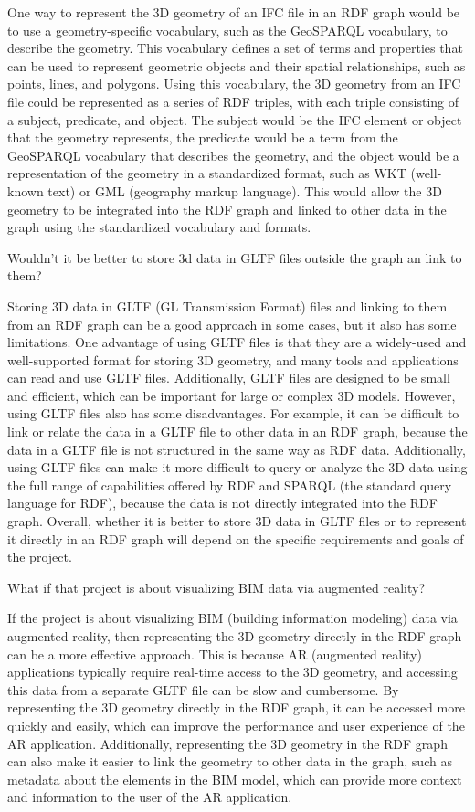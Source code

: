 \begin{description}
	\gpt One way to represent the 3D geometry of an IFC file in an RDF graph would be to use a geometry-specific vocabulary, such as the GeoSPARQL vocabulary, to describe the geometry. This vocabulary defines a set of terms and properties that can be used to represent geometric objects and their spatial relationships, such as points, lines, and polygons. Using this vocabulary, the 3D geometry from an IFC file could be represented as a series of RDF triples, with each triple consisting of a subject, predicate, and object. The subject would be the IFC element or object that the geometry represents, the predicate would be a term from the GeoSPARQL vocabulary that describes the geometry, and the object would be a representation of the geometry in a standardized format, such as WKT (well-known text) or GML (geography markup language). This would allow the 3D geometry to be integrated into the RDF graph and linked to other data in the graph using the standardized vocabulary and formats.

	\me Wouldn't it be better to store 3d data in GLTF files outside the graph an link to them?

	\gpt Storing 3D data in GLTF (GL Transmission Format) files and linking to them from an RDF graph can be a good approach in some cases, but it also has some limitations. One advantage of using GLTF files is that they are a widely-used and well-supported format for storing 3D geometry, and many tools and applications can read and use GLTF files. Additionally, GLTF files are designed to be small and efficient, which can be important for large or complex 3D models. However, using GLTF files also has some disadvantages. For example, it can be difficult to link or relate the data in a GLTF file to other data in an RDF graph, because the data in a GLTF file is not structured in the same way as RDF data. Additionally, using GLTF files can make it more difficult to query or analyze the 3D data using the full range of capabilities offered by RDF and SPARQL (the standard query language for RDF), because the data is not directly integrated into the RDF graph. Overall, whether it is better to store 3D data in GLTF files or to represent it directly in an RDF graph will depend on the specific requirements and goals of the project.

	\me What if that project is about visualizing BIM data via augmented reality?

	\gpt If the project is about visualizing BIM (building information modeling) data via augmented reality, then representing the 3D geometry directly in the RDF graph can be a more effective approach. This is because AR (augmented reality) applications typically require real-time access to the 3D geometry, and accessing this data from a separate GLTF file can be slow and cumbersome. By representing the 3D geometry directly in the RDF graph, it can be accessed more quickly and easily, which can improve the performance and user experience of the AR application. Additionally, representing the 3D geometry in the RDF graph can also make it easier to link the geometry to other data in the graph, such as metadata about the elements in the BIM model, which can provide more context and information to the user of the AR application.


\end{description}
